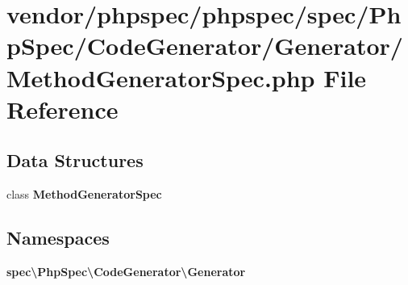 \section{vendor/phpspec/phpspec/spec/\+Php\+Spec/\+Code\+Generator/\+Generator/\+Method\+Generator\+Spec.php File Reference}
\label{_method_generator_spec_8php}
\subsection*{Data Structures}
\begin{DoxyCompactItemize}
\item 
class {\bf Method\+Generator\+Spec}
\end{DoxyCompactItemize}
\subsection*{Namespaces}
\begin{DoxyCompactItemize}
\item 
 {\bf spec\textbackslash{}\+Php\+Spec\textbackslash{}\+Code\+Generator\textbackslash{}\+Generator}
\end{DoxyCompactItemize}
